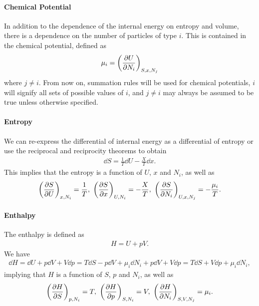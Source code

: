 \paragraph{Chemical Potential}
In addition to the dependence of the internal energy on entropy and volume, there is a dependence on the number of particles of type $i$. This is contained in the chemical potential, defined as
\begin{align*}
	\mu_{i} = \left(\pdv{U}{N_{i}}\right)_{S, x, N_{j}}
\end{align*}
where $j \neq i$. From now on, summation rules will be used for chemical potentials, $i$ will signify all sets of possible values of $i$, and $j\neq i$ may always be assumed to be true unless otherwise specified.

\paragraph{Entropy}
We can re-express the differential of internal energy as a differential of entropy or use the reciprocal and reciprocity theorems to obtain
\begin{align*}
	\dd{S} = \frac{1}{T}\dd{U} - \frac{X}{T}\dd{x}.
\end{align*}
This implies that the entropy is a function of $U$, $x$ and $N_{i}$, as well as
\begin{align*}
	\left(\pdv{S}{U}\right)_{x, N_{i}} = \frac{1}{T},\ \left(\pdv{S}{x}\right)_{U, N_{i}} = -\frac{X}{T},\ \left(\pdv{S}{N_{i}}\right)_{U, x, N_{j}} = -\frac{\mu_{i}}{T}.
\end{align*}

\paragraph{Enthalpy}
The enthalpy is defined as 
\begin{align*}
	H = U + pV.
\end{align*}
We have
\begin{align*}
	\dd{H} = \dd{U} + p\dd{V} + V\dd{p} = T\dd{S} - p\dd{V} + \mu_{i}\dd{N_{i}} + p\dd{V} + V\dd{p} = T\dd{S} + V\dd{p} + \mu_{i}\dd{N_{i}},
\end{align*}
implying that $H$ is a function of $S$, $p$ and $N_{i}$, as well as
\begin{align*}
	\fix{\pdv{H}{S}}{p, N_{i}} = T,\ \fix{\pdv{H}{p}}{S, N_{i}} = V,\ \fix{\pdv{H}{N_{i}}}{S, V,  N_{j}} = \mu_{i}.
\end{align*}


